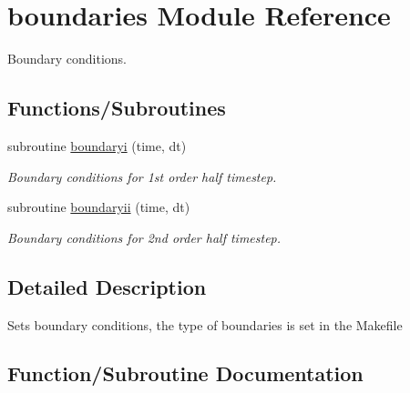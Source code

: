 \hypertarget{namespaceboundaries}{}\section{boundaries Module Reference}
\label{namespaceboundaries}


Boundary conditions.  


\subsection*{Functions/\+Subroutines}
\begin{DoxyCompactItemize}
\item 
subroutine \hyperlink{namespaceboundaries_a3742debeb694e374aed0d5b1e6970b8a}{boundaryi} (time, dt)
\begin{DoxyCompactList}\small\item\em Boundary conditions for 1st order half timestep. \end{DoxyCompactList}\item 
subroutine \hyperlink{namespaceboundaries_ae74a7f6b33366d1adac94ac3bc438104}{boundaryii} (time, dt)
\begin{DoxyCompactList}\small\item\em Boundary conditions for 2nd order half timestep. \end{DoxyCompactList}\end{DoxyCompactItemize}


\subsection{Detailed Description}
Sets boundary conditions, the type of boundaries is set in the Makefile 

\subsection{Function/\+Subroutine Documentation}
\hypertarget{namespaceboundaries_a3742debeb694e374aed0d5b1e6970b8a}{}

